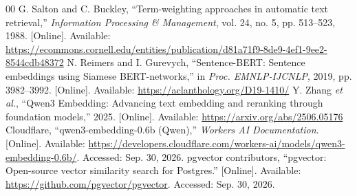 \documentclass[conference]{IEEEtran}
\begin{document}
\begin{thebibliography}{00}
 G. Salton and C. Buckley, ``Term-weighting approaches in automatic text retrieval,'' \emph{Information Processing \& Management}, vol. 24, no. 5, pp. 513--523, 1988. [Online]. Available: \url{https://ecommons.cornell.edu/entities/publication/d81a71f9-8de9-4ef1-9ee2-8544cdb48372}
 N. Reimers and I. Gurevych, ``Sentence-BERT: Sentence embeddings using Siamese BERT-networks,'' in \emph{Proc. EMNLP-IJCNLP}, 2019, pp. 3982--3992. [Online]. Available: \url{https://aclanthology.org/D19-1410/}
 Y. Zhang \emph{et al.}, ``Qwen3 Embedding: Advancing text embedding and reranking through foundation models,'' 2025. [Online]. Available: \url{https://arxiv.org/abs/2506.05176}
 Cloudflare, ``qwen3-embedding-0.6b (Qwen),'' \emph{Workers AI Documentation}. [Online]. Available: \url{https://developers.cloudflare.com/workers-ai/models/qwen3-embedding-0.6b/}. Accessed: Sep. 30, 2026.
 pgvector contributors, ``pgvector: Open-source vector similarity search for Postgres.'' [Online]. Available: \url{https://github.com/pgvector/pgvector}. Accessed: Sep. 30, 2026.
\end{thebibliography}
\end{document}
